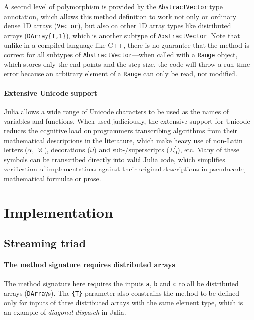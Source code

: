 \documentclass{article}
\begin{document}
A second level of polymorphism is provided by the \lstinline|AbstractVector|
type annotation, which allows this method definition to work not only on
ordinary dense 1D arrays (\lstinline|Vector|), but also on other 1D array types
like distributed arrays (\lstinline|DArray{T,1}|), which is another subtype of
\lstinline|AbstractVector|. Note that unlike in a compiled language like C++,
there is no guarantee that the method is correct for all subtypes of
\lstinline|AbstractVector|---when called with a \lstinline|Range| object, which
stores only the end points and the step size, the code will throw a run time
error because an arbitrary element of a \lstinline|Range| can only be read, not
modified.

\paragraph{Extensive Unicode support}
Julia allows a wide range of Unicode characters to be used as the names of
variables and functions. When used judiciously, the extensive support for
Unicode reduces the cognitive load on programmers transcribing algorithms from
their mathematical descriptions in the literature, which make heavy use of
non-Latin letters ($\alpha$, $\aleph$), decorations ($\hat{\omega}$) and
sub-/superscripts ($\Sigma^\prime_0$), etc. Many of these symbols can be
transcribed directly into valid Julia code, which simplifies verification of
implementations against their original descriptions in pseudocode, mathematical
formulae or prose.

\section{Implementation}

\subsection{Streaming triad}

\paragraph{The method signature requires distributed arrays}
The method signature here requires the inputs \lstinline|a|, \lstinline|b| and
\lstinline|c| to all be distributed arrays (\lstinline|DArray|s). The
\lstinline|{T}| parameter also constrains the method to be defined only for
inputs of three distributed arrays with the same element type, which is an
example of \textit{diagonal dispatch} in Julia.
\end{document}
